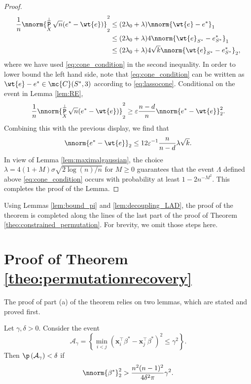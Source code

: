 \documentclass[11pt]{article}
\DeclareMathOperator{\pr}{\texttt{P}}
\def\x{\mathbf{x}}
\def\epss{\varepsilon}
\begin{document}
\begin{proof}
\begin{align*}
  \frac{1}{n} \nnorm{\pr_X^{\perp} \sqrt{n}   (e^* - \wt{e})}_2^2 &\leq (2 \lambda_0 + \lambda) \nnorm{\wt{e} - e^*}_1 \\
  &\leq (2 \lambda_0 + \lambda) 4 \nnorm{\wt{e}_{S^*} - e_{S^*}^*}_1 \\
  &\leq (2 \lambda_0 + \lambda) 4 \sqrt{k} \nnorm{\wt{e}_{S^*} - e_{S^*}^*}_2, 
\end{align*}
where we have used \eqref{eq:cone_condition} in the second inequality.  
In order to lower bound the left hand side, note that \eqref{eq:cone_condition} can be written as
$\wt{e} - e^* \in \mc{C}(S^*, 3)$ according to \eqref{eq:lassocone}. Conditional on the event in Lemma
\ref{lem:RE},
\begin{equation*}
\frac{1}{n} \nnorm{\pr_X^{\perp} \sqrt{n}   (e^* - \wt{e})}_2^2 \geq  \epss \frac{n-d}{n}  \nnorm{e^* - \wt{e}}_2^2.
\end{equation*}
Combining this with the previous display, we find that
\begin{equation*}
 \nnorm{e^* - \wt{e}}_2 \leq 12  \epss^{-1} \frac{n}{n-d} \lambda \sqrt{k}. 
\end{equation*}
\noindent In view of Lemma \ref{lem:maximalgaussian}, the choice $\lambda = 4 (1 + M) \sigma \sqrt{2 \log(n) / n}$ for $M \geq 0$
guarantees that the event $\Lambda$ defined above \eqref{eq:cone_condition} occurs with probability at least $1 - 2n^{-M^2}$.
This completes the proof of the Lemma. 
\end{proof}
\noindent Using Lemmas \ref{lem:bound_pi} and \ref{lem:decoupling_LAD}, the proof of the theorem is completed along the lines
of the last part of the proof of Theorem \ref{theo:constrained_permutation}. For brevity, we omit those steps here.

\section{Proof of Theorem \ref{theo:permutationrecovery}}
The proof of part (a) of the theorem relies on two lemmas, which are stated and proved first. 
\begin{lemma}\label{lem:up}
Let $\gamma, \delta > 0$. Consider the event 
\begin{equation}\label{eq:Agamma}
\mathcal{A}_{\gamma}= \left\{\min_{i<j}(\x_i^\top\beta^*-\x_j^\top\beta^*)^2\le \gamma^2 \right\}.
\end{equation}
Then $\p\left( \mathcal{A}_{\gamma}\right)< \delta$ if 
\[
\nnorm{\beta^*}_2^2>\dfrac{n^2(n-1)^2}{4\delta^2\pi}\gamma^2.
\]	
\end{lemma}
\end{document}
